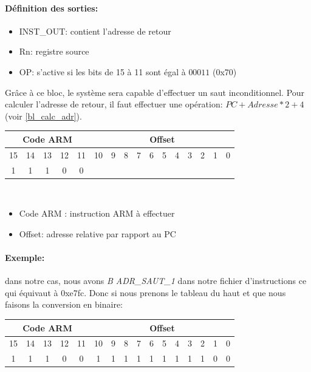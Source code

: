 \documentclass[a4paper]{article} %
\begin{document}
\paragraph{Définition des sorties:}
\begin{itemize}
    \item     INST\_OUT: contient l'adresse de retour
    \item     Rn: registre source
    \item     OP: s'active si les bits de 15 à 11 sont égal à $00011$ (0x70)
\end{itemize}

\medskip
Grâce à ce bloc, le système sera capable d'effectuer un saut inconditionnel. Pour calculer l'adresse de retour, il faut effectuer une opération: $PC + Adresse*2 + 4$ (voir \ref{bl_calc_adr}).\\

\begin{tabular}{|ccccc|ccccccccccc|}
    \hline
    \multicolumn{5}{|c|}{Code ARM}  & \multicolumn{11}{|c|}{Offset}\\
    \hline
    15 & 14 & 13 & 12 & 11          & 10 & 9 & 8 & 7 & 6 & 5 & 4 & 3 & 2 & 1 & 0 \\
    \hline
    1  & 1  & 1  & 0  & 0           & \multicolumn{11}{|c|}{}\\
    \hline     
    \end{tabular}
    \\
\begin{itemize}
    \item     Code ARM : instruction ARM à effectuer
    \item     Offset: adresse relative par rapport au PC
\end{itemize}


\paragraph{Exemple:} dans notre cas, nous avons \textit{B ADR\_SAUT\_1} dans notre fichier d'instructions ce qui équivaut à 0xe7fc. Donc si nous prenons le tableau du haut et que nous faisons la conversion en binaire:
\\
\begin{tabular}{|ccccc|ccccccccccc|}
    \hline
    \multicolumn{5}{|c|}{Code ARM}  & \multicolumn{11}{|c|}{Offset}\\
    \hline
    15 & 14 & 13 & 12 & 11          & 10 & 9 & 8 & 7 & 6 & 5 & 4 & 3 & 2 & 1 & 0 \\
    \hline
    1  & 1  & 1  & 0  & 0           & 1  & 1 & 1 & 1 & 1 & 1 & 1 & 1 & 1 & 0 & 0\\
    \hline     
    \end{tabular}
    
\end{document}
